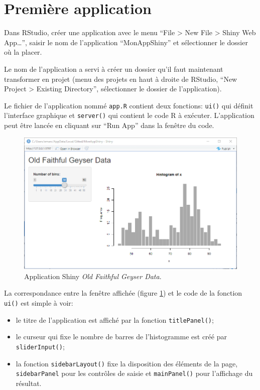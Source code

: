 \documentclass[
  11pt,
  french,
  a4paper,
  extrafontsizes,onecolumn,openright
  ]{memoir}
\providecommand{\tightlist}{%
  \setlength{\itemsep}{0pt}\setlength{\parskip}{0pt}}
\begin{document}
\hypertarget{premiuxe8re-application}{%
\section{Première application}\label{premiuxe8re-application}}

Dans RStudio, créer une application avec le menu ``File \textgreater{} New File \textgreater{} Shiny Web App\ldots{}'', saisir le nom de l'application ``MonAppShiny'' et sélectionner le dossier où la placer.

Le nom de l'application a servi à créer un dossier qu'il faut maintenant transformer en projet (menu des projets en haut à droite de RStudio, ``New Project \textgreater{} Existing Directory'', sélectionner le dossier de l'application).

Le fichier de l'application nommé \texttt{app.R} contient deux fonctions: \texttt{ui()} qui définit l'interface graphique et \texttt{server()} qui contient le code R à exécuter.
L'application peut être lancée en cliquant sur ``Run App'' dans la fenêtre du code.



\scriptsize

\begin{figure}

{\centering \includegraphics[width=0.8\linewidth]{images/shiny-geiser} 

}

\caption{Application Shiny \emph{Old Faithful Geyser Data}.}\label{fig:shiny-geiser}
\end{figure}

\normalsize

La correspondance entre la fenêtre affichée (figure \ref{fig:shiny-geiser}) et le code de la fonction \texttt{ui()} est simple à voir:

\begin{itemize}
\tightlist
\item
  le titre de l'application est affiché par la fonction \texttt{titlePanel()};
\item
  le curseur qui fixe le nombre de barres de l'histogramme est créé par \texttt{sliderInput()};
\item
  la fonction \texttt{sidebarLayout()} fixe la disposition des éléments de la page, \texttt{sidebarPanel} pour les contrôles de saisie et \texttt{mainPanel()} pour l'affichage du résultat.
\end{itemize}
\end{document}
